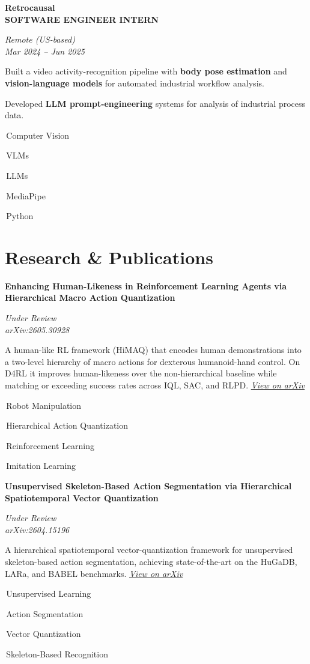 \documentclass[10pt,a4paper]{article}
\let\orighref\href
\renewcommand{\href}[2]{\orighref{#1}{\uline{\textit{#2}}}}
\newlength{\datew}
\newlength{\pubw}
\newcommand{\pubentryline}[3]{%
  \noindent\begingroup
  \settowidth{\datew}{\itshape#2}%
  \settowidth{\pubw}{\itshape\small #3}%
  \ifdim\pubw>\datew \setlength{\datew}{\pubw}\fi
  \parbox[t]{\dimexpr\linewidth-\datew-1em\relax}{\raggedright\bfseries\color{heading}#1}%
  \hfill
  \parbox[t]{\datew}{\raggedleft\itshape\color{accent}#2\\[2pt]{\itshape\small\color{muted}#3}}%
  \par
  \endgroup
}
\newcommand{\pubentry}[3]{%
  \par\vspace{-\parskip}\vspace{\entryskip}\vspace{-2pt}%
  \pubentryline{#1}{#2}{#3}%
}
\newlength{\entryskip}\setlength{\entryskip}{10pt}
\newcommand{\firstentry}{\vspace{\parskip}\vspace{-\entryskip}\vspace{2pt}}
\newlength{\entrylocw}
\newcommand{\gridentryline}[4]{%
  \noindent\begingroup
  \settowidth{\entrylocw}{\itshape #2}%
  \settowidth{\datew}{\itshape\small #4}%
  \ifdim\datew>\entrylocw \setlength{\entrylocw}{\datew}\fi
  \parbox[t]{\dimexpr\linewidth-\entrylocw-1em\relax}{\raggedright\bfseries\color{heading}#1\\[2pt]{\small\color{muted}\MakeUppercase{#3}}}%
  \hfill
  \parbox[t]{\entrylocw}{\raggedleft\itshape\color{accent}#2\\[2pt]{\itshape\small\color{muted}#4}}%
  \par
  \endgroup
}
\newcommand{\gridentry}[4]{%
  \par\vspace{-\parskip}\vspace{\entryskip}\vspace{-2pt}%
  \gridentryline{#1}{#2}{#3}{#4}%
}
\newcommand{\chip}[1]{%
  \setlength{\fboxsep}{2pt}%
  \colorbox{chipbg}{\color{accentdk}\small\strut\,#1\,}\hspace{2pt}}
\begin{document}
\gridentry{Retrocausal}{Remote (US-based)}{Software Engineer Intern}{Mar 2024 -- Jun 2025}
\vspace{3pt}
\begin{tight}
  \item Built a video activity-recognition pipeline with \textbf{body pose estimation} and \textbf{vision-language models} for automated industrial workflow analysis.
  \item Developed \textbf{LLM prompt-engineering} systems for analysis of industrial process data.
\end{tight}
\vspace{3pt}
{\footnotesize\chip{Computer Vision}\chip{VLMs}\chip{LLMs}\chip{MediaPipe}\chip{Python}}

\section{Research \& Publications}
\firstentry
\pubentry{Enhancing Human-Likeness in Reinforcement Learning Agents via Hierarchical Macro Action Quantization}{Under Review}{arXiv:2605.30928}
\vspace{3pt}

A human-like RL framework (HiMAQ) that encodes human demonstrations into a two-level hierarchy of
macro actions for dexterous humanoid-hand control. On D4RL it improves human-likeness over the
non-hierarchical baseline while matching or exceeding success rates across IQL, SAC, and RLPD.
\href{https://arxiv.org/abs/2605.30928}{View on arXiv}
\vspace{3pt}

{\footnotesize\chip{Robot Manipulation}\chip{Hierarchical Action Quantization}\chip{Reinforcement Learning}\chip{Imitation Learning}}

\pubentry{Unsupervised Skeleton-Based Action Segmentation via Hierarchical Spatiotemporal Vector Quantization}{Under Review}{arXiv:2604.15196}
\vspace{3pt}

A hierarchical spatiotemporal vector-quantization framework for unsupervised skeleton-based action
segmentation, achieving state-of-the-art on the HuGaDB, LARa, and BABEL benchmarks.
\href{https://arxiv.org/abs/2604.15196}{View on arXiv}
\vspace{3pt}

{\footnotesize\chip{Unsupervised Learning}\chip{Action Segmentation}\chip{Vector Quantization}\chip{Skeleton-Based Recognition}}
\end{document}
